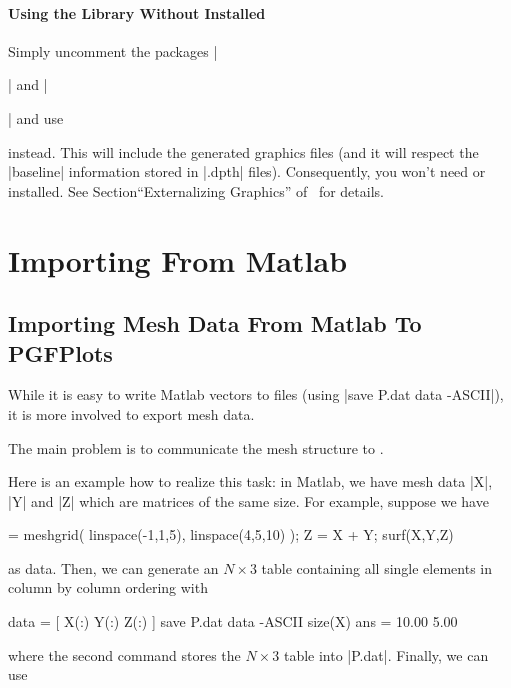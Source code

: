 {\begin{pgfgraphicnamed}


\paragraph{Using the Library Without {\normalfont\pgfname} Installed}

Simply uncomment the packages |\usepackage{tikz}| and |\usepackage{pgfplots}|
and use
%
\begin{codeexample}
\long{}
\end{codeexample}
%
instead. This will include the generated graphics files (and it will respect
the |baseline| information stored in |.dpth| files). Consequently, you won't
need \pgfname{} or \PGFPlots{} installed. See Section``Externalizing Graphics''
of~\cite{tikz} for details.


\section{Importing From Matlab}

\subsection{Importing Mesh Data From Matlab To PGFPlots}
\label{sec:pgfplots:import:matlab}

While it is easy to write Matlab vectors to files (using
|save P.dat data -ASCII|), it is more involved to export mesh data.

The main problem is to communicate the mesh structure to \PGFPlots{}.

Here is an example how to realize this task: in Matlab, we have mesh data |X|,
|Y| and |Z| which are matrices of the same size. For example, suppose we have
%
\begin{codeexample} = meshgrid( linspace(-1,1,5), linspace(4,5,10) );
Z = X + Y;
surf(X,Y,Z)
\end{codeexample}
%
\noindent as data. Then, we can generate an $N \times 3$ table containing all
single elements in column by column ordering with
%
\begin{codeexample}
data = [ X(:) Y(:) Z(:) ]
save P.dat data -ASCII
size(X)
ans =
   10.00    5.00
\end{codeexample}
%
\noindent where the second command stores the $N \times 3$ table into |P.dat|.
Finally, we can use


\end{pgfgraphicnamed}}
